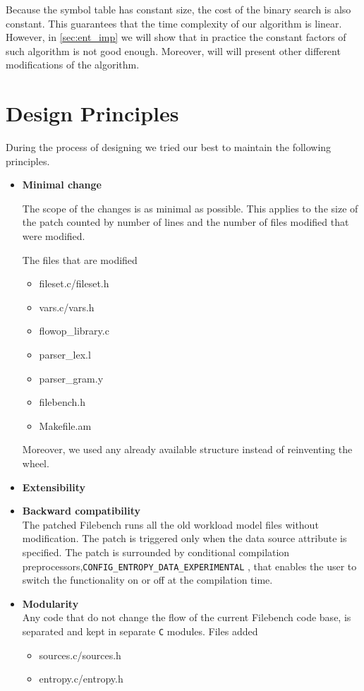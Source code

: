 Because the symbol table has constant size, the cost of the binary search is also constant.
This guarantees that the time complexity of our algorithm is linear. However, in \ref{sec:ent_imp} we will show that in practice the 
constant factors of such algorithm is not good enough. Moreover, will will present other different modifications
of the algorithm.


\section{Design Principles}
During the process of designing we tried our best to maintain the following principles. 

\begin{itemize}

\item \textbf{Minimal change} %

The scope of the changes is as minimal as possible. This applies to the size of the patch counted by number of lines and the number of files modified that were modified. 

The files that are modified
\begin{itemize}
\item fileset.c/fileset.h
\item vars.c/vars.h
\item flowop\_library.c
\item parser\_lex.l
\item parser\_gram.y
\item filebench.h
\item Makefile.am
\end{itemize}
Moreover, we used any already available structure instead of reinventing the wheel.

\item \textbf{Extensibility} \\

\item \textbf{Backward compatibility} \\
The patched Filebench runs all the old workload model files without modification. The patch is triggered only when the data source attribute is specified.
 The patch is surrounded by conditional compilation preprocessors,\verb+CONFIG_ENTROPY_DATA_EXPERIMENTAL+ , that enables the user to switch the functionality on or off at the compilation time.

\item \textbf{Modularity}\\
Any code that do not change the flow of the current Filebench code base, is separated and kept in separate \verb+C+ modules.
 Files added
\begin{itemize}
\item sources.c/sources.h 
\item entropy.c/entropy.h
\end{itemize}

\end{itemize}
